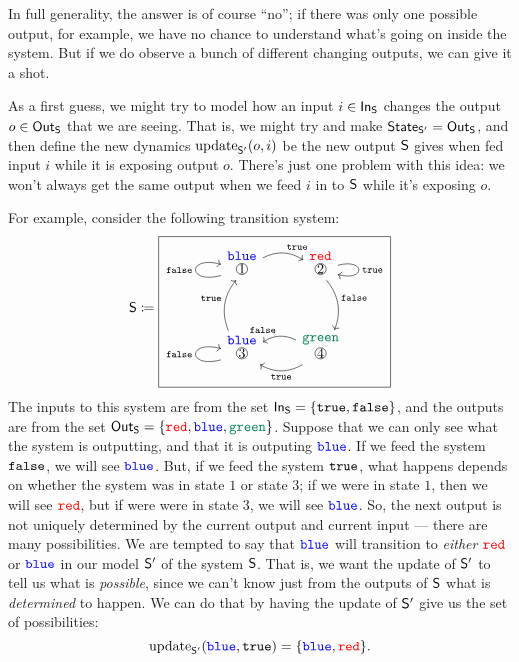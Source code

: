 \documentclass[DynamicalBook]{subfiles}
\begin{document}
In full generality, the answer is of course ``no''; if there was only one
possible output, for example, we have no chance to understand what's going on
inside the system. But if we do observe a bunch of different changing outputs,
we can give it a shot.

As a first guess, we might try to model how an input $i \in \mathsf{In}_{\mathsf{S}}$ changes the
output $o \in \mathsf{Out}_{\mathsf{S}}$ that we are seeing. That is, we might try and make
$\mathsf{State}_{\mathsf{S'}} = \mathsf{Out}_{\mathsf{S}}$, and then define the new dynamics $\mathrm{update}_{\mathsf{S'}}(o, i)$ be
the new output $\mathsf{S}$ gives when fed input $i$ while it is exposing output
$o$. There's just one problem with this idea: we won't always get the same
output when we feed $i$ in to $\mathsf{S}$ while it's exposing $o$.

For example, consider the following transition system:
\begin{equation}\label{eqn.possibilistic_transition_1}
\Sys{S} \coloneqq
  \begin{tikzpicture}[baseline=(bl)]
	\node[draw] (bl) {
  \begin{tikzcd}[column sep=small]
    \LMOO{1}{\Blue} \ar[loop left, "\const{false}"] \ar[rr, bend left, "\const{true}"] \ar[dd, leftarrow, bend right, "\true"'] &  & \LMOO{2}{\Red} \ar[loop right, "\true"] \ar[dd, bend left, "\const{false}" ]\\
    & & \\
    \LMOO{3}{\Blue} \ar[loop left, "\false"] \ar[rr, leftarrow, bend left, "\false"] \ar[rr, leftarrow, bend right, "\true"'] & & \LMOO{4}{\Green}
  \end{tikzcd}};
\end{tikzpicture}
\end{equation}
The inputs to this system are from the set $\mathsf{In}_{\mathsf{S}} = \{\mathtt{true}, \mathtt{false}\}$, and
the outputs are from the set $\Out{S} = \{\Red, \Blue, \Green\}$. Suppose that we can only see
what the system is outputting, and that it is outputing ${\color{blue} \mathtt{blue}}$. If we feed the
system $\mathtt{false}$, we will see ${\color{blue} \mathtt{blue}}$. But, if we feed the system $\mathtt{true}$, what
happens depends on whether the system was in state $1$ or state $3$; if we were
in state $1$, then we will see ${\color{red} \mathtt{red}}$, but if were were in state $3$, we will
see ${\color{blue} \mathtt{blue}}$. So, the next output is not uniquely determined by the current
output and current input --- there are many possibilities. We are tempted to say
that ${\color{blue} \mathtt{blue}}$ will transition to \emph{either} ${\color{red} \mathtt{red}}$ or ${\color{blue} \mathtt{blue}}$ in our model
$\mathsf{S'}$ of the system $\mathsf{S}$. That is, we want the update of $\mathsf{S'}$ to
tell us what is \emph{possible}, since we can't know just from the outputs of
$\mathsf{S}$ what is \emph{determined} to happen. We can do that by having the
update of $\mathsf{S'}$ give us the set of possibilities:
$$\mathrm{update}_{\mathsf{S'}}({\color{blue} \mathtt{blue}}, \mathtt{true}) = \{{\color{blue} \mathtt{blue}}, {\color{red} \mathtt{red}}\}.$$
\end{document}
